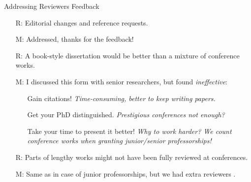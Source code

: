 \documentclass[9pt]{beamer}					%
\begin{document}
\begin{frame}{Addressing Reviewers Feedback}
\begin{itemize}
    \item[R:] Editorial changes and reference requests.
    \item[M:] Addressed, thanks for the feedback!
    \item[R:] A book-style dissertation would be better than a mixture of conference works.
    \item[M:] I discussed this form with senior researchers, but found \emph{ineffective}:
    \begin{itemize}
        \item[\emoji{carrot}] Gain citations! \emph{Time-consuming, better to keep writing papers.}
        \item[\emoji{carrot}] Get your PhD distinguished. \emph{Prestigious conferences not enough?}
        \item[\emoji{sweat-droplets}] Take your time to present it better! \emph{Why to work harder? We count conference works when granting junior/senior  professorships!} 
    \end{itemize}
    \item[R:] Parts of lengthy works might not have been fully reviewed at conferences.
    \item[M:] Same as in case of junior professorships, but we had extra reviewers .
\end{itemize}
\end{frame}
\end{document}
